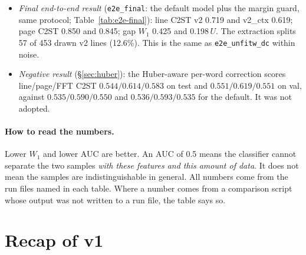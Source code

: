 \documentclass[11pt,a4paper]{article}
\newcommand{\U}{\ensuremath{U}}
\begin{document}
\begin{itemize}
  protocol): line C2ST v2 0.719 and v2\_ctx 0.654; page C2ST 0.844 and 0.847;
  gap $W_1$ 0.387 and 0.183\,\U. The extraction splits 52 of 469 drawn v2
  lines (11\%), against 89 of 462 (19\%) with the leverage model. Slope and
  drift $W_1$ rise, but the split lines are the steep and bowed ones, so these
  $W_1$ values are not comparable across runs with different split rates
  (\S\ref{sec:e2e}).
\item \emph{Final end-to-end result} (\texttt{e2e\_final}: the default model
  plus the margin guard, same protocol; Table~\ref{tab:e2e-final}): line C2ST
  v2 0.719 and v2\_ctx 0.619; page C2ST 0.850 and 0.845; gap $W_1$ 0.425 and
  0.198\,\U. The extraction splits 57 of 453 drawn v2 lines (12.6\%). This is
  the same as \texttt{e2e\_unfitw\_dc} within noise.
\item \emph{Negative result} (\S\ref{sec:huber}): the Huber-aware per-word
  correction scores line/page/FFT C2ST $0.544/0.614/0.583$ on test and
  $0.551/0.619/0.551$ on val, against $0.535/0.590/0.550$ and
  $0.536/0.593/0.535$ for the default. It was not adopted.
\end{itemize}

\paragraph{How to read the numbers.} Lower $W_1$ and lower AUC are better. An
AUC of 0.5 means the classifier cannot separate the two samples \emph{with
these features and this amount of data}. It does not mean the samples are
indistinguishable in general. All numbers come from the run files named in
each table. Where a number comes from a comparison script whose output was not
written to a run file, the table says so.

\section{Recap of v1}
\label{sec:v1}
\end{document}
